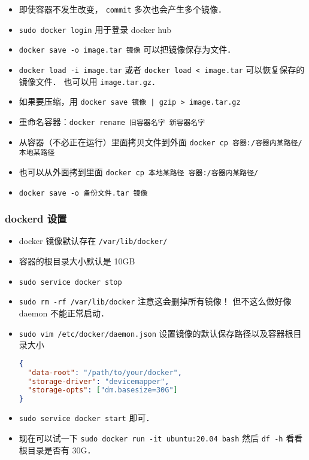 \begin{itemize}
\item 即使容器不发生改变， \verb|commit| 多次也会产生多个镜像．
\item \verb`sudo docker login` 用于登录 docker hub
\item \verb|docker save -o image.tar 镜像| 可以把镜像保存为文件．
\item \verb|docker load -i image.tar| 或者 \verb|docker load < image.tar| 可以恢复保存的镜像文件． 也可以用 \verb|image.tar.gz|．
\item 如果要压缩，用 \verb`docker save 镜像 | gzip > image.tar.gz`
\item 重命名容器：\verb|docker rename 旧容器名字 新容器名字|
\item 从容器（不必正在运行）里面拷贝文件到外面 \verb|docker cp 容器:/容器内某路径/ 本地某路径|
\item 也可以从外面拷到里面 \verb|docker cp 本地某路径 容器:/容器内某路径/|
\item \verb|docker save -o 备份文件.tar 镜像|
\end{itemize}

\subsubsection{dockerd 设置}
\begin{itemize}
\item docker 镜像默认存在 \verb|/var/lib/docker/|
\item 容器的根目录大小默认是 10GB
\item \verb|sudo service docker stop|
\item \verb|sudo rm -rf /var/lib/docker| 注意这会删掉所有镜像！ 但不这么做好像 daemon 不能正常启动．
\item \verb|sudo vim /etc/docker/daemon.json| 设置镜像的默认保存路径以及容器根目录大小
\begin{lstlisting}[language=json]
{
  "data-root": "/path/to/your/docker",
  "storage-driver": "devicemapper",
  "storage-opts": ["dm.basesize=30G"]
}
\end{lstlisting}
\item \verb|sudo service docker start| 即可．
\item 现在可以试一下 \verb|sudo docker run -it ubuntu:20.04 bash| 然后 \verb|df -h| 看看根目录是否有 30G．
\end{itemize}


